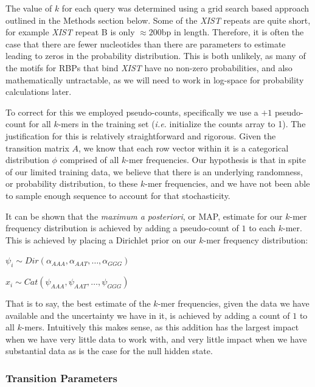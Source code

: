 The value of $k$ for each query was determined using a grid search based approach outlined in the Methods section below. Some of the \emph{XIST} repeats are quite short, for example \emph{XIST} repeat B is only $\approx 200$bp in length. Therefore, it is often the case that there are fewer nucleotides than there are parameters to estimate leading to zeros in the probability distribution. This is both unlikely, as many of the motifs for RBPs that bind \emph{XIST} have no non-zero probabilities, and also mathematically untractable, as we will need to work in log-space for probability calculations later.

To correct for this we employed pseudo-counts, specifically we use a $+1$ pseudo-count for all $k$-mers in the training set (\emph{i.e.} initialize the counts array to 1). The justification for this is relatively straightforward and rigorous. Given the transition matrix $A$, we know that each row vector within it is a categorical distribution $\phi$ comprised of all $k$-mer frequencies. Our hypothesis is that in spite of our limited training data, we believe that there is an underlying randomness, or probability distribution, to these $k$-mer frequencies, and we have not been able to sample enough sequence to account for that stochasticity. 

It can be shown that the \emph{maximum a posteriori}, or MAP, estimate for our $k$-mer frequency distribution is achieved by adding a pseudo-count of $1$ to each $k$-mer. This is achieved by placing a Dirichlet prior on our $k$-mer frequency distribution:

\begin{center}
    $\psi_i \sim Dir(\alpha_{AAA},\alpha_{AAT},\dots,\alpha_{GGG})$
    
    $x_i \sim Cat(\psi_{AAA},\psi_{AAT},\dots,\psi_{GGG})$
\end{center}

That is to say, the best estimate of the $k$-mer frequencies, given the data we have available and the uncertainty we have in it, is achieved by adding a count of $1$ to all $k$-mers. Intuitively this makes sense, as this addition has the largest impact when we have very little data to work with, and very little impact when we have substantial data as is the case for the null hidden state.

\subsubsection{Transition Parameters}

